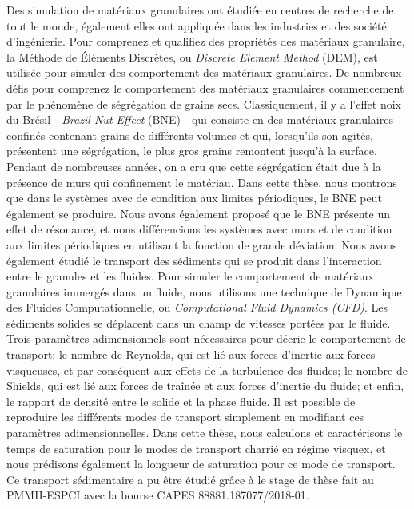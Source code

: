
\begin{resumo}[Résumé]
    Des simulation de matériaux granulaires ont étudiée en centres de recherche de tout le monde, également elles ont appliquée dans les industries et des société d'ingénierie. Pour comprenez et qualifiez des propriétés des matériaux granulaire, la Méthode de Éléments Discrètes, ou \textit{Discrete Element Method} (DEM), est utilisée pour simuler des comportement des matériaux granulaires.
    De nombreux défis pour comprenez le comportement des matériaux granulaires commencement par le phénomène de ségrégation de grains secs. Classiquement, il y a l'effet noix du Brésil - \textit{Brazil Nut Effect} (BNE) - qui consiste en des matériaux granulaires confinés contenant grains de différents volumes et qui, lorsqu'ils son agités, présentent une ségrégation, le plus gros grains remontent jusqu'à la surface. Pendant de nombreuses années, on a cru que cette ségrégation était due à la présence de murs qui confinement le matériau. Dans cette thèse, nous montrons que dans le systèmes avec de condition aux limites périodiques, le BNE peut également se produire. Nous avons également proposé que le BNE présente un effet de résonance, et nous différencions les systèmes avec murs et de condition aux limites périodiques en utilisant la fonction de grande déviation.
    Nous avons également étudié le transport des sédiments qui se produit dans l'interaction entre le granules et les fluides. Pour simuler le comportement de matériaux granulaires immergés dans un fluide, nous utilisons une technique de Dynamique des Fluides Computationnelle, ou \textit{Computational Fluid Dynamics (CFD)}. Les sédiments solides se déplacent dans un champ de vitesses portées par le fluide. Trois paramètres adimensionnels sont nécessaires pour décrie le comportement de transport: le nombre de Reynolds, qui est lié aux forces d'inertie aux forces visqueuses, et par conséquent aux effets de la turbulence des fluides; le nombre de Shields, qui est lié aux forces de traînée et aux forces d'inertie du fluide; et enfin, le rapport de densité entre le solide et la phase fluide. Il est possible de reproduire les différents modes de transport simplement en modifiant ces paramètres adimensionnelles. Dans cette thèse, nous calculons et caractérisons le temps de saturation pour le modes de transport charrié en régime visquex, et nous prédisons également la longueur de saturation pour ce mode de transport. Ce transport sédimentaire a pu être étudié grâce à le stage de thèse fait au PMMH-ESPCI avec la bourse CAPES 88881.187077/2018-01.


\end{resumo}
